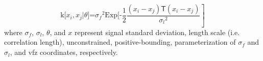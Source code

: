 \begin{equation} \label{eq:squared-exponential}
	\left.\text{k[}x_i,x_j\text{$|\theta $]=}\sigma _f{}^2\text{Exp[-}\frac{1}{2}\frac{\left(x_i-x_j\right)\mathsf{T}\left(x_i-x_j\right)}{\sigma _l{}^2}\right]
\end{equation}
where $\sigma _f$, $\sigma _l$, $\theta$, and $x$ represent signal standard deviation, length scale (i.e. correlation length), unconstrained, positive-bounding, parameterization of $\sigma _f$ and $\sigma _l$, and \gls{vfz} coordinates, respectively.